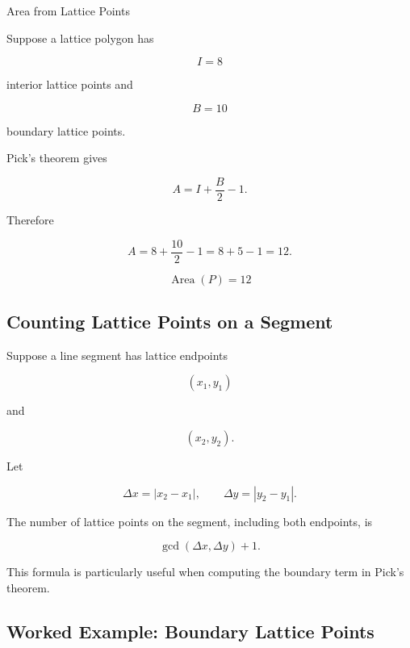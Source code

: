 \begin{workedexamplebox}{Area from Lattice Points}

Suppose a lattice polygon has

\[
I=8
\]

interior lattice points and

\[
B=10
\]

boundary lattice points.

Pick's theorem gives

\[
A
=
I+\frac{B}{2}-1.
\]

Therefore

\[
A
=
8+\frac{10}{2}-1
=
8+5-1
=
12.
\]

\begin{answerbox}
\[
\boxed{
\operatorname{Area}(P)=12
}
\]
\end{answerbox}
\end{workedexamplebox}

\subsection{Counting Lattice Points on a Segment}
\label{subsec:lattice-points-segment}

Suppose a line segment has lattice endpoints

\[
(x_1,y_1)
\]

and

\[
(x_2,y_2).
\]

Let

\[
\Delta x=|x_2-x_1|,
\qquad
\Delta y=|y_2-y_1|.
\]

The number of lattice points on the segment, including both endpoints, is

\[
\boxed{
\gcd(\Delta x,\Delta y)+1.
}
\]

This formula is particularly useful when computing the boundary term in
Pick's theorem.

\subsection{Worked Example: Boundary Lattice Points}
\label{subsec:worked-boundary-lattice-points}

